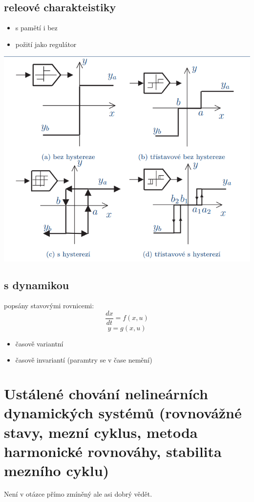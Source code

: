 \subsection*{releové charakteistiky}
\begin{itemize}
    \item s pamětí i bez
    \item požití jako regulátor
\end{itemize}
\includegraphics*{img/rele.png}


\subsection{s dynamikou}
popsány stavovými rovnicemi:
\[
    \frac{dx}{dt}=f(x,u)\]
    \[y=g(x,u)\]


\begin{itemize}   
    \item časově variantní
    \item časově invariantí (paramtry se v čase nemění)
\end{itemize}
\newpage
\section{Ustálené chování nelineárních dynamických systémů (rovnovážné stavy, mezní cyklus, metoda
harmonické rovnováhy, stabilita mezního cyklu)}

Není v otázce přímo zmíněný ale asi dobrý vědět.

